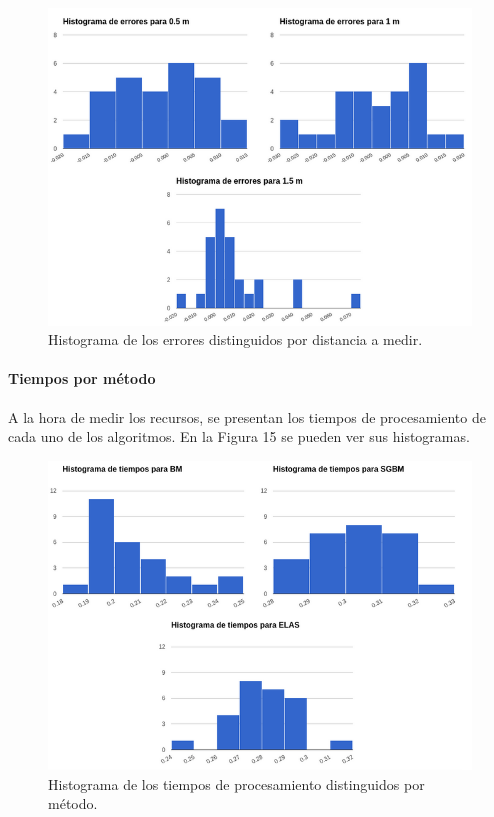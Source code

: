 \documentclass[11pt,a4paper,titlepage]{article}
\newcommand{\Figure}[1]{Figura #1}
\begin{document}
\begin{figure}[h!]

  \centering
    \includegraphics[width=1\textwidth]{f14.png}
  \caption{Histograma de los errores distinguidos por distancia a medir.}
\end{figure}

\paragraph{Tiempos por método}
\hfill \break

A la hora de medir los recursos, se presentan los tiempos de procesamiento de cada uno de los algoritmos. En la \Figure{15} se pueden ver sus histogramas.


\begin{figure}[h!]

  \centering
    \includegraphics[width=1\textwidth]{f15.png}
  \caption{Histograma de los tiempos de procesamiento distinguidos por método.}
\end{figure}
\end{document}
